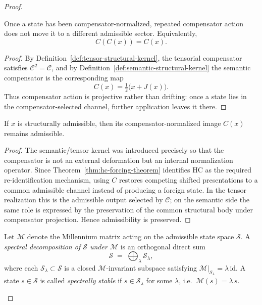 \begin{proof}
\begin{lemma}
\label{lem:hc-idempotence-lemma}
Once a state has been compensator-normalized, repeated compensator action does
not move it to a different admissible sector. Equivalently,
\[
C(C(x)) = C(x).
\]
\end{lemma}

\begin{proof}
By Definition~\ref{def:tensor-structural-kernel}, the tensorial compensator
satisfies $\mathcal C^2=\mathcal C$, and by
Definition~\ref{def:semantic-structural-kernel} the semantic compensator is the
corresponding map
\[
C(x)=\tfrac12\bigl(x+J(x)\bigr).
\]
Thus compensator action is projective rather than drifting: once a state lies
in the compensator-selected channel, further application leaves it there.
\end{proof}

\begin{lemma}
\label{lem:hc-admissibility-lemma}
If $x$ is structurally admissible, then its compensator-normalized image $C(x)$
remains admissible.
\end{lemma}

\begin{proof}
The semantic/tensor kernel was introduced precisely so that the compensator is
not an external deformation but an internal normalization operator. Since
Theorem~\ref{thm:hc-forcing-theorem} identifies HC as the required
re-identification mechanism, using $C$ restores competing shifted presentations
to a common admissible channel instead of producing a foreign state. In the
tensor realization this is the admissible output selected by $\mathcal C$; on
the semantic side the same role is expressed by the preservation of the common
structural body under compensator projection. Hence admissibility is preserved.
\end{proof}


\begin{definition}
\label{def:spectral-decomposition-M}
Let $\mathcal{M}$ denote the Millennium matrix acting on the admissible state
space $\mathcal{S}$. A \emph{spectral decomposition of $\mathcal{S}$ under
$\mathcal{M}$} is an orthogonal direct sum
\[
  \mathcal{S} \;=\; \bigoplus_{\lambda} \mathcal{S}_\lambda,
\]
where each $\mathcal{S}_\lambda \subset \mathcal{S}$ is a closed
$\mathcal{M}$-invariant subspace satisfying
$\mathcal{M}|_{\mathcal{S}_\lambda} = \lambda\,\mathrm{id}$.
A state $s \in \mathcal{S}$ is called \emph{spectrally stable} if
$s \in \mathcal{S}_\lambda$ for some $\lambda$, i.e.\ $\mathcal{M}(s) =
\lambda\,s$.
\end{definition}


\end{proof}
